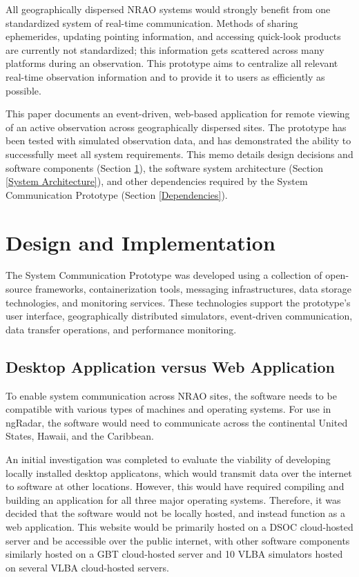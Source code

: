 \documentclass[12pt]{article}
\begin{document}
All geographically dispersed NRAO systems would strongly benefit from one standardized system of real-time communication. Methods of sharing ephemerides, updating pointing information, and accessing quick-look products are currently not standardized; this information gets scattered across many platforms during an observation. This prototype aims to centralize all relevant real-time observation information and to provide it to users as efficiently as possible.

This paper documents an event-driven, web-based application for remote viewing of an active observation across geographically dispersed sites. The prototype has been tested with simulated observation data, and has demonstrated the ability to successfully meet all system requirements. This memo details design decisions and software components (Section \ref{Design and Implementation}), the software system architecture (Section \ref{System Architecture}), and other dependencies required by the System Communication Prototype (Section \ref{Dependencies}).


\section{Design and Implementation} \label{Design and Implementation}

The System Communication Prototype was developed using a collection of open-source frameworks, containerization tools, messaging infrastructures, data storage technologies, and monitoring services. These technologies support the prototype's user interface, geographically distributed simulators, event-driven communication, data transfer operations, and performance monitoring.


\subsection*{Desktop Application versus Web Application}
  To enable system communication across NRAO sites, the software needs to be compatible with various types of machines and operating systems. For use in ngRadar, the software would need to communicate across the continental United States, Hawaii, and the Caribbean.
    
  An initial investigation was completed to evaluate the viability of developing locally installed desktop applicatons, which would transmit data over the internet to software at other locations. However, this would have required compiling and building an application for all three major operating systems. Therefore, it was decided that the software would not be locally hosted, and instead function as a web application. This website would be primarily hosted on a DSOC cloud-hosted server and be accessible over the public internet, with other software components similarly hosted on a GBT cloud-hosted server and 10 VLBA simulators hosted on several VLBA cloud-hosted servers. 
  
\end{document}
